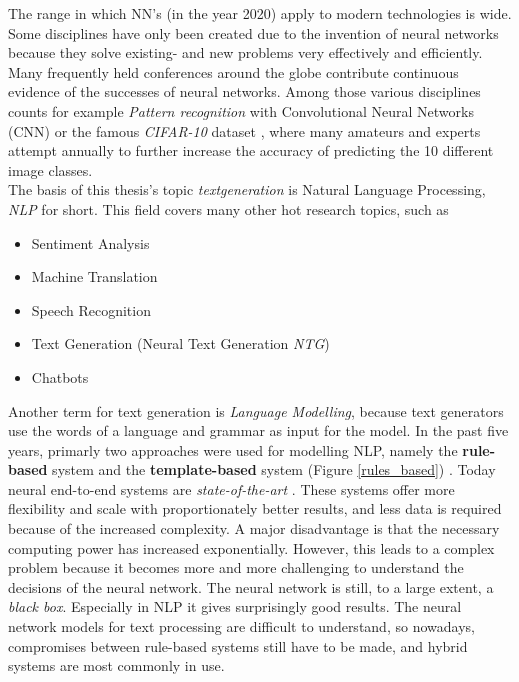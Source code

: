 The range in which NN's (in the year 2020) apply to modern technologies is wide. Some disciplines have only been created due to the invention of neural networks because they solve existing- and new problems very effectively and efficiently. Many frequently held conferences around the globe contribute continuous evidence of the successes of neural networks. Among those various disciplines counts for example \textit{Pattern recognition} with Convolutional Neural Networks (CNN) \cite{cnn} or the famous \textit{CIFAR-10} dataset \cite{cifar}, where many amateurs \cite{tim} and experts attempt annually to further increase the accuracy of predicting the 10 different image classes. \\
The basis of this thesis's topic \textit{textgeneration} is Natural Language Processing, \textit{NLP} for short. This field covers many other hot research topics, such as 


\begin{itemize}
\item Sentiment Analysis
\item Machine Translation
\item Speech Recognition
\item Text Generation (Neural Text Generation \textit{NTG})
\item Chatbots
\end{itemize}

Another term for text generation is  \textit{Language Modelling}, because text generators use the words of a language and grammar as input for the model. In the past five years, primarly two approaches were used for modelling NLP, namely the \textbf{rule-based} system and the \textbf{template-based} system (Figure \ref{rules_based}) \cite{NTG2}. Today neural end-to-end systems are \textit{state-of-the-art} \cite{End_to_End}. These systems offer more flexibility and scale with proportionately better results, and less data is required because of the increased complexity. A major disadvantage is that the necessary computing power has increased exponentially. However, this leads to a complex problem because it becomes more and more challenging to understand the decisions of the neural network. The neural network is still, to a large extent, a \textit{black box}. Especially in NLP it gives surprisingly good results. The neural network models for text processing are difficult to understand, so nowadays, compromises between rule-based systems still have to be made, and hybrid systems are most commonly in use. 


